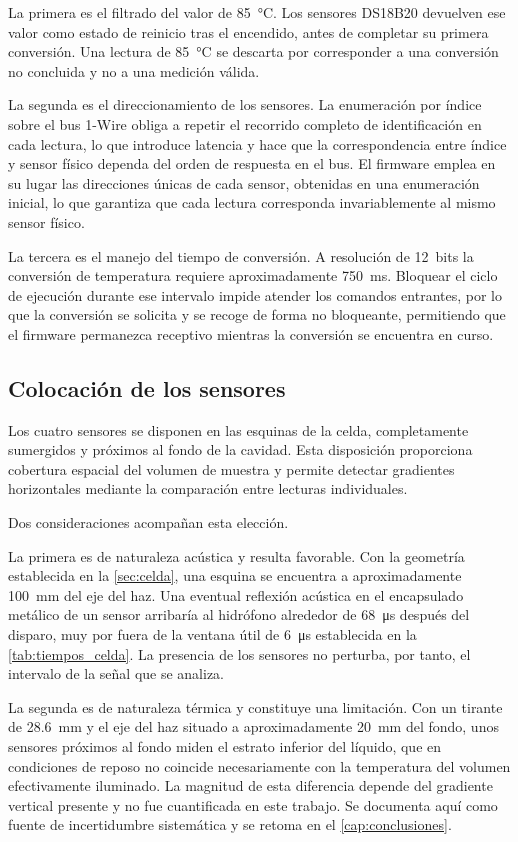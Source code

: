 La primera es el filtrado del valor de \SI{85}{\celsius}. Los
sensores DS18B20 devuelven ese valor como estado de reinicio tras el
encendido, antes de completar su primera conversión. Una lectura de
\SI{85}{\celsius} se descarta por corresponder a una conversión no
concluida y no a una medición válida.

La segunda es el direccionamiento de los sensores. La enumeración por
índice sobre el bus 1-Wire obliga a repetir el recorrido completo de
identificación en cada lectura, lo que introduce latencia y hace que
la correspondencia entre índice y sensor físico dependa del orden de
respuesta en el bus. El firmware emplea en su lugar las direcciones
únicas de cada sensor, obtenidas en una enumeración inicial, lo que
garantiza que cada lectura corresponda invariablemente al mismo
sensor físico.

La tercera es el manejo del tiempo de conversión. A resolución de
\SI{12}{bits} la conversión de temperatura requiere aproximadamente
\SI{750}{\milli\second}. Bloquear el ciclo de ejecución durante ese
intervalo impide atender los comandos entrantes, por lo que la
conversión se solicita y se recoge de forma no bloqueante,
permitiendo que el firmware permanezca receptivo mientras la
conversión se encuentra en curso.

\subsection*{Colocación de los sensores}

Los cuatro sensores se disponen en las esquinas de la celda,
completamente sumergidos y próximos al fondo de la cavidad. Esta
disposición proporciona cobertura espacial del volumen de muestra y
permite detectar gradientes horizontales mediante la comparación
entre lecturas individuales.

Dos consideraciones acompañan esta elección.

La primera es de naturaleza acústica y resulta favorable. Con la
geometría establecida en la \cref{sec:celda}, una esquina se
encuentra a aproximadamente \SI{100}{\milli\meter} del eje del haz.
Una eventual reflexión acústica en el encapsulado metálico de un
sensor arribaría al hidrófono alrededor de \SI{68}{\micro\second}
después del disparo, muy por fuera de la ventana útil de
\SI{6}{\micro\second} establecida en la \cref{tab:tiempos_celda}. La
presencia de los sensores no perturba, por tanto, el intervalo de la
señal que se analiza.

La segunda es de naturaleza térmica y constituye una limitación. Con
un tirante de \SI{28.6}{\milli\meter} y el eje del haz situado a
aproximadamente \SI{20}{\milli\meter} del fondo, unos sensores
próximos al fondo miden el estrato inferior del líquido, que en
condiciones de reposo no coincide necesariamente con la temperatura
del volumen efectivamente iluminado. La magnitud de esta diferencia
depende del gradiente vertical presente y no fue cuantificada en este
trabajo. Se documenta aquí como fuente de incertidumbre sistemática y
se retoma en el \cref{cap:conclusiones}.

